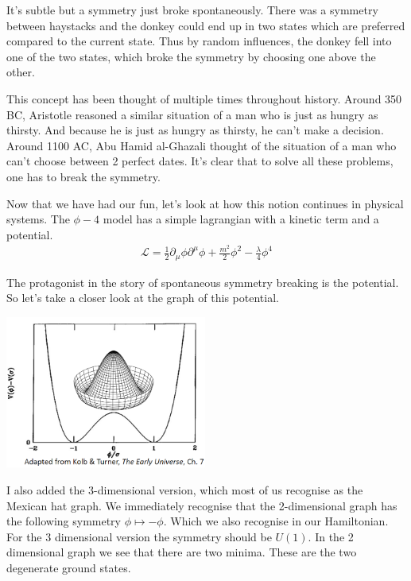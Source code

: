 \documentclass{article}
\numberwithin{equation}{section}
\begin{document}
It's subtle but a symmetry just broke spontaneously.
There was a symmetry between haystacks and the donkey could end up in two states which are preferred compared to the current state.
Thus by random influences, the donkey fell into one of the two states, which broke the symmetry by choosing one above the other.

This concept has been thought of multiple times throughout history.
Around 350 BC, Aristotle reasoned a similar situation of a man who is just as hungry as thirsty. 
And because he is just as hungry as thirsty, he can't make a decision.
Around 1100 AC, Abu Hamid al-Ghazali thought of the situation of a man who can't choose between 2 perfect dates.
It's clear that to solve all these problems, one has to break the symmetry.

Now that we have had our fun, let's look at how this notion continues in physical systems.
The $\phi-4$ model has a simple lagrangian with a kinetic term and a potential.
\begin{align}
    \mathcal{L}=\frac{1}{2}\partial_\mu\phi\partial^\mu\phi +\frac{m^2}{2}\phi^2-\frac{\lambda}{4}\phi^4
    \label{eq:phi-4-Lagrangian}
\end{align}

The protagonist in the story of spontaneous symmetry breaking is the potential.
So let's take a closer look at the graph of this potential.

\begin{center}
\includegraphics[width=250px]{Knipsel.PNG}    
\end{center}

I also added the 3-dimensional version, which most of us recognise as the Mexican hat graph.
We immediately recognise that the 2-dimensional graph has the following symmetry $\phi\mapsto -\phi$.
Which we also recognise in our Hamiltonian.
For the 3 dimensional version the symmetry should be $U(1)$.
In the 2 dimensional graph we see that there are two minima. 
These are the two degenerate ground states.
\end{document}
